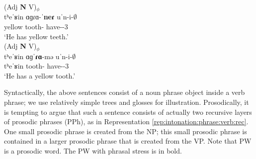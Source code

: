 \begin{exe}
	\ex \label{prosodic phrease: verb: mod n} 
	\begin{xlist}
		\ex \glll (Adj \textbf{N} V)$_\phi$ \\
		tʰeˈʁin ɑɡɾɑ-ˈ\textbf{neɾ} uˈn-i-$\emptyset$\\ 
		yellow tooth-{\pl} have-{\thgloss}-3{\sg} \\
		\trans `He has yellow teeth.'\label{prosodic phrease: verb: a npl v} \\ 
		\ex \glll (Adj \textbf{N} V)$_\phi$ \\
		tʰeˈʁin  ɑɡˈ\textbf{ɾɑ}-mə uˈn-i-$\emptyset$\\ 
		tʰeˈʁin  tooth-{\indf} have-{\thgloss}-3{\sg} \\
		\trans `He has a yellow tooth.' \\ 
		
\end{xlist}\end{exe}

Syntactically, the above sentences consist of a noun phrase object inside a verb phrase; we use relatively simple trees and glosses for illustration. Prosodically, it is tempting to argue that such a sentence consists of actually two recursive layers of prosodic phrases (PPh), as in Representation \ref{rep:intonation:phrase:verb:rec}. One small prosodic phrase is created from the NP; this small prosodic phrase is contained in a larger prosodic phrase that is created from the VP. Note that PW is a prosodic word.  The PW with phrasal stress is in bold. 

